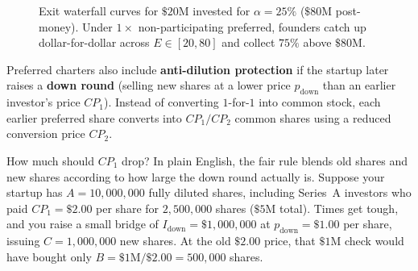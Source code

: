 \begin{figure}[htbp]
\caption{Exit waterfall curves for $\$20\text{M}$ invested for $\alpha = 25\%$ ($\$80\text{M}$ post-money). Under $1\times$ non-participating preferred, founders catch up dollar-for-dollar across $E \in [20, 80]$ and collect $75\%$ above $\$80\text{M}$.}
\label{fig:waterfall-payout-curves}
\end{figure}

\label{subsec:anti-dilution-down-rounds}
Preferred charters also include \textbf{anti-dilution protection} if the startup later raises a \textbf{down round} (selling new shares at a lower price $p_{\text{down}}$ than an earlier investor's price $CP_1$). Instead of converting $1$-for-$1$ into common stock, each earlier preferred share converts into $CP_1 / CP_2$ common shares using a reduced conversion price $CP_2$.

How much should $CP_1$ drop? In plain English, the fair rule blends old shares and new shares according to how large the down round actually is. Suppose your startup has $A = 10{,}000{,}000$ fully diluted shares, including Series~A investors who paid $CP_1 = \$2.00$ per share for $2{,}500{,}000$ shares ($\$5\text{M}$ total). Times get tough, and you raise a small bridge of $I_{\text{down}} = \$1{,}000{,}000$ at $p_{\text{down}} = \$1.00$ per share, issuing $C = 1{,}000{,}000$ new shares. At the old $\$2.00$ price, that $\$1\text{M}$ check would have bought only $B = \$1\text{M} / \$2.00 = 500{,}000$ shares.


